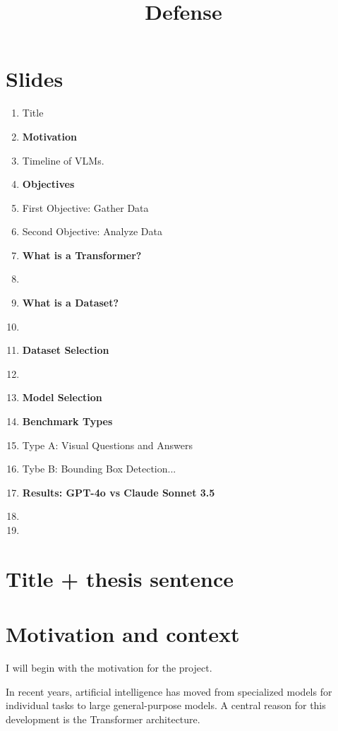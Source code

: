 \documentclass[11pt,a4paper]{article}
\title{\textbf{Defense}}
\author{}
\date{}
\begin{document}
\maketitle
\tableofcontents

\section{Slides}

\begin{enumerate}
\item Title
\item \textbf{Motivation}
\item Timeline of VLMs.
\item \textbf{Objectives}
\item First Objective: Gather Data
\item Second Objective: Analyze Data
\item \textbf{What is a Transformer?}
\item
\item \textbf{What is a Dataset?}
\item 
\item \textbf{Dataset Selection}
\item
\item \textbf{Model Selection}
\item
\iten \textbf{Benchmark Types}
\item Type A: Visual Questions and Answers
\item Tybe B: Bounding Box Detection...
\item \textbf{Results: GPT-4o vs Claude Sonnet 3.5}
\item
\item
\end{enumerate}

\section{Title + thesis sentence}

\section{Motivation and context}

I will begin with the motivation for the project.

In recent years, artificial intelligence has moved from specialized models for individual tasks to large general-purpose models. A central reason for this development is the Transformer architecture.
\end{document}
